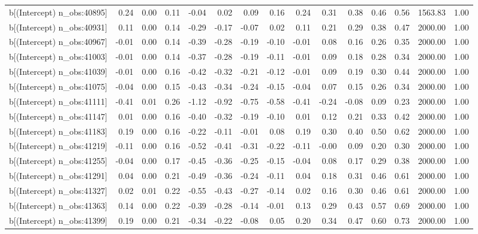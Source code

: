 \begin{table}[ht]
\begin{tabular}{rrrrrrrrrrrrrrr}
  b[(Intercept) n\_obs:40895] & 0.24 & 0.00 & 0.11 & -0.04 & 0.02 & 0.09 & 0.16 & 0.24 & 0.31 & 0.38 & 0.46 & 0.56 & 1563.83 & 1.00 \\ 
  b[(Intercept) n\_obs:40931] & 0.11 & 0.00 & 0.14 & -0.29 & -0.17 & -0.07 & 0.02 & 0.11 & 0.21 & 0.29 & 0.38 & 0.47 & 2000.00 & 1.00 \\ 
  b[(Intercept) n\_obs:40967] & -0.01 & 0.00 & 0.14 & -0.39 & -0.28 & -0.19 & -0.10 & -0.01 & 0.08 & 0.16 & 0.26 & 0.35 & 2000.00 & 1.00 \\ 
  b[(Intercept) n\_obs:41003] & -0.01 & 0.00 & 0.14 & -0.37 & -0.28 & -0.19 & -0.11 & -0.01 & 0.09 & 0.18 & 0.28 & 0.34 & 2000.00 & 1.00 \\ 
  b[(Intercept) n\_obs:41039] & -0.01 & 0.00 & 0.16 & -0.42 & -0.32 & -0.21 & -0.12 & -0.01 & 0.09 & 0.19 & 0.30 & 0.44 & 2000.00 & 1.00 \\ 
  b[(Intercept) n\_obs:41075] & -0.04 & 0.00 & 0.15 & -0.43 & -0.34 & -0.24 & -0.15 & -0.04 & 0.07 & 0.15 & 0.26 & 0.34 & 2000.00 & 1.00 \\ 
  b[(Intercept) n\_obs:41111] & -0.41 & 0.01 & 0.26 & -1.12 & -0.92 & -0.75 & -0.58 & -0.41 & -0.24 & -0.08 & 0.09 & 0.23 & 2000.00 & 1.00 \\ 
  b[(Intercept) n\_obs:41147] & 0.01 & 0.00 & 0.16 & -0.40 & -0.32 & -0.19 & -0.10 & 0.01 & 0.12 & 0.21 & 0.33 & 0.42 & 2000.00 & 1.00 \\ 
  b[(Intercept) n\_obs:41183] & 0.19 & 0.00 & 0.16 & -0.22 & -0.11 & -0.01 & 0.08 & 0.19 & 0.30 & 0.40 & 0.50 & 0.62 & 2000.00 & 1.00 \\ 
  b[(Intercept) n\_obs:41219] & -0.11 & 0.00 & 0.16 & -0.52 & -0.41 & -0.31 & -0.22 & -0.11 & -0.00 & 0.09 & 0.20 & 0.30 & 2000.00 & 1.00 \\ 
  b[(Intercept) n\_obs:41255] & -0.04 & 0.00 & 0.17 & -0.45 & -0.36 & -0.25 & -0.15 & -0.04 & 0.08 & 0.17 & 0.29 & 0.38 & 2000.00 & 1.00 \\ 
  b[(Intercept) n\_obs:41291] & 0.04 & 0.00 & 0.21 & -0.49 & -0.36 & -0.24 & -0.11 & 0.04 & 0.18 & 0.31 & 0.46 & 0.61 & 2000.00 & 1.00 \\ 
  b[(Intercept) n\_obs:41327] & 0.02 & 0.01 & 0.22 & -0.55 & -0.43 & -0.27 & -0.14 & 0.02 & 0.16 & 0.30 & 0.46 & 0.61 & 2000.00 & 1.00 \\ 
  b[(Intercept) n\_obs:41363] & 0.14 & 0.00 & 0.22 & -0.39 & -0.28 & -0.14 & -0.01 & 0.13 & 0.29 & 0.43 & 0.57 & 0.69 & 2000.00 & 1.00 \\ 
  b[(Intercept) n\_obs:41399] & 0.19 & 0.00 & 0.21 & -0.34 & -0.22 & -0.08 & 0.05 & 0.20 & 0.34 & 0.47 & 0.60 & 0.73 & 2000.00 & 1.00 \\ 

\end{tabular}
\end{table}
